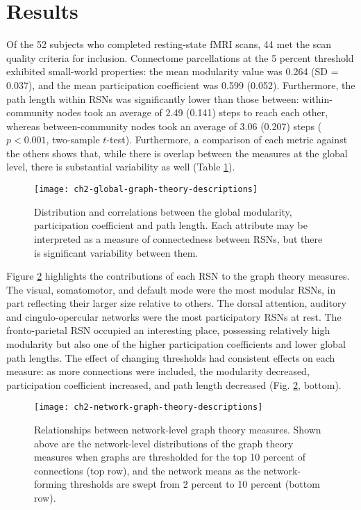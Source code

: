 \section{Results} 

Of the 52 subjects who completed resting-state fMRI scans, 44 met the scan quality criteria for inclusion. Connectome parcellations at the 5 percent threshold exhibited small-world properties: the mean modularity value was 0.264 (SD = 0.037), and the mean participation coefficient was 0.599 (0.052). Furthermore, the path length within RSNs was significantly lower than those between: within-community nodes took an average of 2.49 (0.141) steps to reach each other, whereas between-community nodes took an average of 3.06 (0.207) steps ($p < 0.001$, two-sample $t$-test). Furthermore, a comparison of each metric against the others shows that, while there is overlap between the measures at the global level, there is substantial variability as well (Table \ref{fig:ch2-global-graph-theory-descriptions}).

\begin{figure}[t]
    \centering
    \texttt{[image: ch2-global-graph-theory-descriptions]}
    \caption[Distribution and correlations between global graph theory measures.]{Distribution and correlations between the global modularity, participation coefficient and path length. Each attribute may be interpreted as a measure of connectedness between RSNs, but there is significant variability between them.}
    \label{fig:ch2-global-graph-theory-descriptions}
\end{figure}

Figure \ref{fig:ch2-network-graph-theory-descriptions} highlights the contributions of each RSN to the graph theory measures. The visual, somatomotor, and default mode were the most modular RSNs, in part reflecting their larger size relative to others. The dorsal attention, auditory and cingulo-opercular networks were the most participatory RSNs at rest. The fronto-parietal RSN occupied an interesting place, possessing relatively high modularity but also one of the higher participation coefficients and lower global path lengths. The effect of changing thresholds had consistent effects on each measure: as more connections were included, the modularity decreased, participation coefficient increased, and path length decreased (Fig. \ref{fig:ch2-network-graph-theory-descriptions}, bottom). 

\begin{figure}[t]
    \centering
    \texttt{[image: ch2-network-graph-theory-descriptions]}
    \caption[Relationships between network-level graph theory measures.]{Relationships between network-level graph theory measures. Shown above are the network-level distributions of the graph theory measures when graphs are thresholded for the top 10 percent of connections (top row), and the network means as the network-forming thresholds are swept from 2 percent to 10 percent (bottom row).}
    \label{fig:ch2-network-graph-theory-descriptions}
\end{figure}

